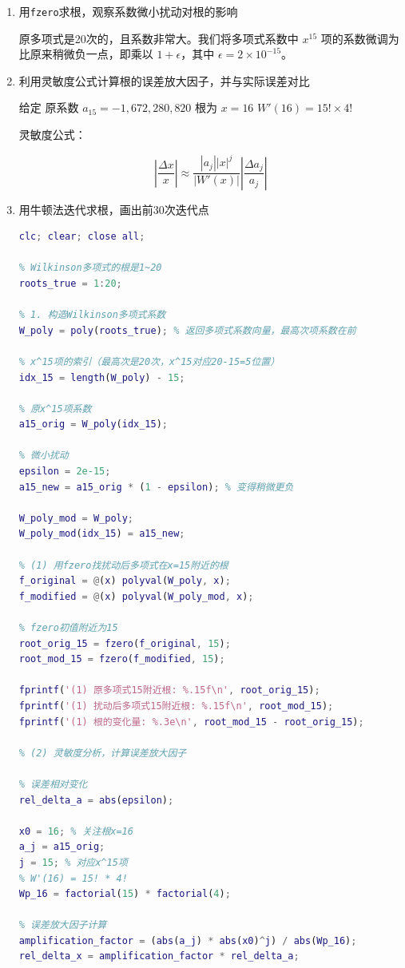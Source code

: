 \begin{enumerate}
    \item 用\verb|fzero|求根，观察系数微小扰动对根的影响

原多项式是20次的，且系数非常大。我们将多项式系数中 $x^{15}$ 项的系数微调为比原来稍微负一点，即乘以 $1 + \epsilon$，其中 $\epsilon = 2 \times 10^{-15}$。
    \item 利用灵敏度公式计算根的误差放大因子，并与实际误差对比

给定
 原系数 $a_{15} = -1,672,280,820$
 根为 $x=16$
 $W'(16) = 15! \times 4!$

灵敏度公式：

$$
\left|\frac{\Delta x}{x}\right| \approx \frac{|a_j| |x|^{j}}{|W'(x)|} \left|\frac{\Delta a_j}{a_j}\right|
$$

    \item 用牛顿法迭代求根，画出前30次迭代点

\begin{lstlisting}[language=matlab]
clc; clear; close all;

% Wilkinson多项式的根是1~20
roots_true = 1:20;

% 1. 构造Wilkinson多项式系数
W_poly = poly(roots_true); % 返回多项式系数向量，最高次项系数在前

% x^15项的索引（最高次是20次，x^15对应20-15=5位置）
idx_15 = length(W_poly) - 15;

% 原x^15项系数
a15_orig = W_poly(idx_15);

% 微小扰动
epsilon = 2e-15;
a15_new = a15_orig * (1 - epsilon); % 变得稍微更负

W_poly_mod = W_poly;
W_poly_mod(idx_15) = a15_new;

% (1) 用fzero找扰动后多项式在x=15附近的根
f_original = @(x) polyval(W_poly, x);
f_modified = @(x) polyval(W_poly_mod, x);

% fzero初值附近为15
root_orig_15 = fzero(f_original, 15);
root_mod_15 = fzero(f_modified, 15);

fprintf('(1) 原多项式15附近根: %.15f\n', root_orig_15);
fprintf('(1) 扰动后多项式15附近根: %.15f\n', root_mod_15);
fprintf('(1) 根的变化量: %.3e\n', root_mod_15 - root_orig_15);

% (2) 灵敏度分析，计算误差放大因子

% 误差相对变化
rel_delta_a = abs(epsilon);

x0 = 16; % 关注根x=16
a_j = a15_orig;
j = 15; % 对应x^15项
% W'(16) = 15! * 4!
Wp_16 = factorial(15) * factorial(4);

% 误差放大因子计算
amplification_factor = (abs(a_j) * abs(x0)^j) / abs(Wp_16);
rel_delta_x = amplification_factor * rel_delta_a;


\end{lstlisting}
\end{enumerate}
